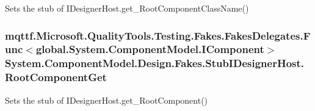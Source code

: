 Sets the stub of I\-Designer\-Host.\-get\-\_\-\-Root\-Component\-Class\-Name()

\hypertarget{class_system_1_1_component_model_1_1_design_1_1_fakes_1_1_stub_i_designer_host_a2a8ee9dc7896ed7b00e3ff719c47e323}{
\subsubsection[{Root\-Component\-Get}]{\setlength{\rightskip}{0pt plus 5cm}mqttf.\-Microsoft.\-Quality\-Tools.\-Testing.\-Fakes.\-Fakes\-Delegates.\-Func$<$global.\-System.\-Component\-Model.\-I\-Component$>$ System.\-Component\-Model.\-Design.\-Fakes.\-Stub\-I\-Designer\-Host.\-Root\-Component\-Get}}\label{class_system_1_1_component_model_1_1_design_1_1_fakes_1_1_stub_i_designer_host_a2a8ee9dc7896ed7b00e3ff719c47e323}


Sets the stub of I\-Designer\-Host.\-get\-\_\-\-Root\-Component()

